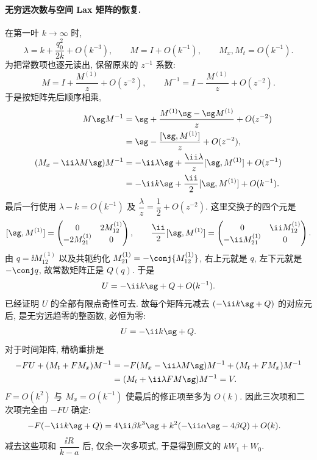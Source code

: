 \paragraph{无穷远次数与空间 Lax 矩阵的恢复.}
在第一叶 $k\to\infty$ 时,
\[
\lambda=k+\dfrac{q_0^2}{2k}+O(k^{-3}),\qquad
M=I+O(k^{-1}),\qquad M_x,M_t=O(k^{-1}).
\]
为把常数项也逐元读出, 保留原来的 $z^{-1}$ 系数:
\[
M=I+\dfrac{M^{(1)}}{z}+O(z^{-2}),\qquad
M^{-1}=I-\dfrac{M^{(1)}}{z}+O(z^{-2}).
\]
于是按矩阵先后顺序相乘,
\begin{align*}
M\sg M^{-1}
&=\sg+\dfrac{M^{(1)}\sg-\sg M^{(1)}}{z}+O(z^{-2})\\
&=\sg-\dfrac{[\sg,M^{(1)}]}{z}+O(z^{-2}),\\
(M_x-\ii\lambda M\sg)M^{-1}
&=-\ii\lambda\sg+\dfrac{\ii\lambda}{z}[\sg,M^{(1)}]+O(z^{-1})\\
&=-\ii k\sg+\dfrac{\ii}{2}[\sg,M^{(1)}]+O(k^{-1}).
\end{align*}
最后一行使用 $\lambda-k=O(k^{-1})$ 及 $\dfrac{\lambda}{z}=\dfrac{1}{2}+O(z^{-2})$.
这里交换子的四个元是
\[
[\sg,M^{(1)}]
=\begin{pmatrix}0&2M^{(1)}_{12}\\-2M^{(1)}_{21}&0\end{pmatrix},\qquad
\dfrac{\ii}{2}[\sg,M^{(1)}]
=\begin{pmatrix}0&\ii M^{(1)}_{12}\\-\ii M^{(1)}_{21}&0\end{pmatrix}.
\]
由 $q=\ii M^{(1)}_{12}$ 以及共轭约化
$M^{(1)}_{21}=-\conj{M^{(1)}_{12}}$, 右上元就是 $q$,
左下元就是 $-\conj q$, 故常数矩阵正是 $Q(q)$.
于是
\[
 U=-\ii k\sg+Q+O(k^{-1}).
\]
已经证明 $ U$ 的全部有限点奇性可去.
故每个矩阵元减去 $(-\ii k\sg+Q)$ 的对应元后,
是无穷远趋零的整函数, 必恒为零:
\[
 U=-\ii k\sg+Q.
\]
对于时间矩阵, 精确重排是
\[
\begin{aligned}
-F U+(M_t+FM_x)M^{-1}
&=-F(M_x-\ii\lambda M\sg)M^{-1}
+(M_t+FM_x)M^{-1}\\
&=(M_t+\ii\lambda F M\sg)M^{-1}= V.
\end{aligned}
\]
$F=O(k^2)$ 与 $M_x=O(k^{-1})$ 使最后的修正项至多为 $O(k)$.
因此三次项和二次项完全由 $-F U$ 确定:
\[
\begin{aligned}
-F(-\ii k\sg+Q)
={}&4\ii\beta k^3\sg
+k^2(-\ii\alpha\sg-4\beta Q)+O(k).
\end{aligned}
\]
减去这些项和 $\dfrac{\ii R}{k-a}$ 后, 仅余一次多项式,
于是得到原文的 $kW_1+W_0$.

